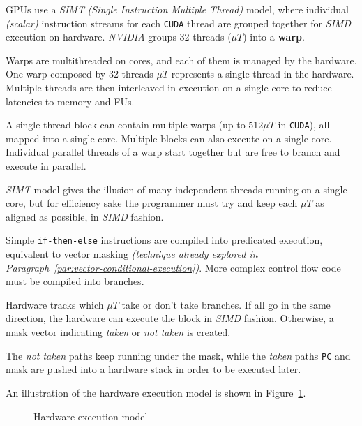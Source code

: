 \documentclass[english]{article}
\begin{document}
\bigskip
GPUs use a \textit{SIMT} \textit{(Single Instruction Multiple Thread)} model, where individual \textit{(scalar)} instruction streams for each \texttt{CUDA} thread are grouped together for \textit{SIMD} execution on hardware.
\textit{NVIDIA} groups \(32\) threads (\(\mu T\)) into a \textbf{warp}.

Warps are multithreaded on cores, and each of them is managed by the hardware.
One warp composed by \(32\) threads \textit{\(\mu T\)} represents a single thread in the hardware.
Multiple threads are then interleaved in execution on a single core to reduce latencies to memory and FUs.

A single thread block can contain multiple warps (up to \(512 \mu T\) in \texttt{CUDA}), all mapped into a single core.
Multiple blocks can also execute on a single core.
Individual parallel threads of a warp start together but are free to branch and execute in parallel.

\textit{SIMT} model gives the illusion of many independent threads running on a single core, but for efficiency sake the programmer must try and keep each \(\mu T\) as aligned as possible, in \textit{SIMD} fashion.

\bigskip
Simple \texttt{if-then-else} instructions are compiled into predicated execution, equivalent to vector masking \textit{(technique already explored in Paragraph~\ref{par:vector-conditional-execution})}.
More complex control flow code must be compiled into branches.

Hardware tracks which \(\mu T\) take or don't take branches.
If all go in the same direction, the hardware can execute the block in \textit{SIMD} fashion.
Otherwise, a mask vector indicating \textit{taken} or \textit{not taken} is created.

The \textit{not taken} paths keep running under the mask,  while the \textit{taken} paths \texttt{PC} and mask are pushed into a hardware stack in order to be executed later.

\bigskip
An illustration of the hardware execution model is shown in Figure~\ref{fig:gpu-hardware-model}.

\begin{figure}[htbp]
  \bigskip
  \centering
  \caption{Hardware execution model}
  \label{fig:gpu-hardware-model}
  \bigskip
\end{figure}
\end{document}
